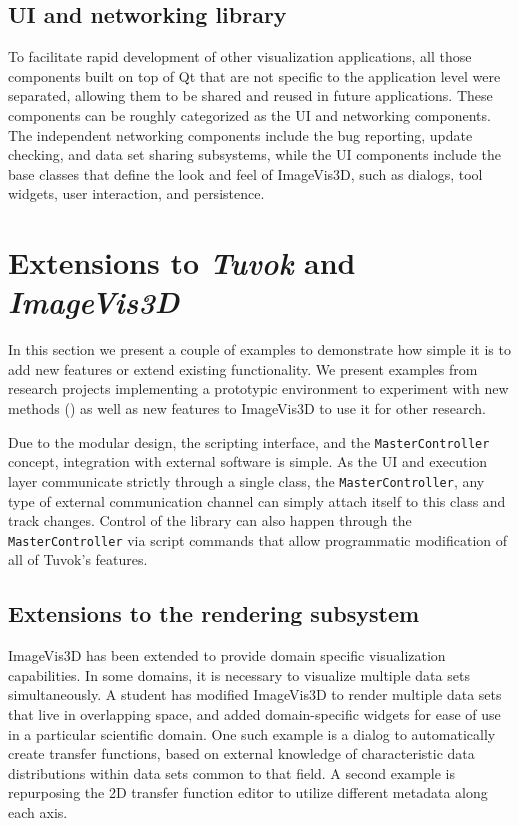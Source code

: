 \subsection{UI and networking library}

To facilitate rapid development of other visualization applications,
all those components built on top of Qt that are
not specific to the application level were separated, allowing
them to be shared and reused in future applications. These
components can be roughly categorized as the UI and networking
components. The independent networking components
include the bug reporting, update checking, and data
set sharing subsystems, while the UI components include
the base classes that define the look and feel of ImageVis3D,
such as dialogs, tool widgets, user interaction, and persistence.

\section{Extensions to \textit{Tuvok} and \textit{ImageVis3D}}
\label{sec:tvk-extensions}

In this section we present a couple of examples to
demonstrate how simple it is to add new features or extend
existing functionality. We present examples from research
projects implementing a prototypic environment to experiment
with new methods () as well as new
features to ImageVis3D to use it for other research.

Due to the modular design, the scripting interface, and
the \texttt{MasterController} concept, integration with external
software is simple. As the UI and execution layer communicate
strictly through a single class, the \texttt{MasterController}, any
type of external communication channel can simply attach
itself to this class and track changes. Control of the library
can also happen through the \texttt{MasterController} via script
commands that allow programmatic modification of all of
Tuvok's features.

\subsection{Extensions to the rendering subsystem}
\label{sec:tvk-arch-rendering-exts}

ImageVis3D has been extended to provide domain specific
visualization capabilities. In some domains, it is necessary
to visualize multiple data sets simultaneously. A student has
modified ImageVis3D to render multiple data sets that live in
overlapping space, and added domain-specific widgets for
ease of use in a particular scientific domain. One such example
is a dialog to automatically create transfer functions,
based on external knowledge of characteristic data distributions
within data sets common to that field. A second example
is repurposing the 2D transfer function editor to utilize
different metadata along each axis.

